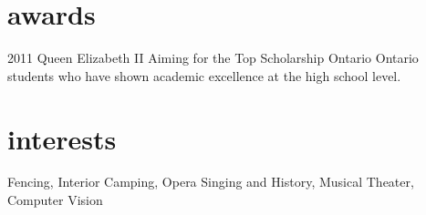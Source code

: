 \documentclass[]{friggeri-cv} %
\begin{document}

\section{awards}

\begin{entrylist}
\entry
{2011}
{Queen Elizabeth II Aiming for the Top Scholarship}
{Ontario}
{Ontario students who have shown academic excellence at the high school level.}
\end{entrylist}


\section{interests}

Fencing, Interior Camping, Opera Singing and History, Musical Theater, Computer Vision
\end{document}
